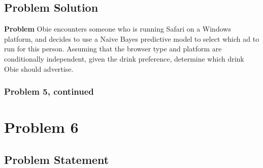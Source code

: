 \documentclass[12pt]{article}
\theoremstyle{definition}
\begin{document}
\newpage
\subsection*{Problem Solution}

\noindent
{\bf Problem} Obie encounters someone who is running Safari on a Windows platform, and decides to use a Naive Bayes predictive model to select which ad to run for this person. Assuming that the browser type and platform are conditionally independent, given the drink preference, determine which drink Obie should advertise.

\newpage
\subsubsection*{Problem 5, continued}



\newpage
\section*{Problem 6}


\subsection*{Problem Statement}
\end{document}

